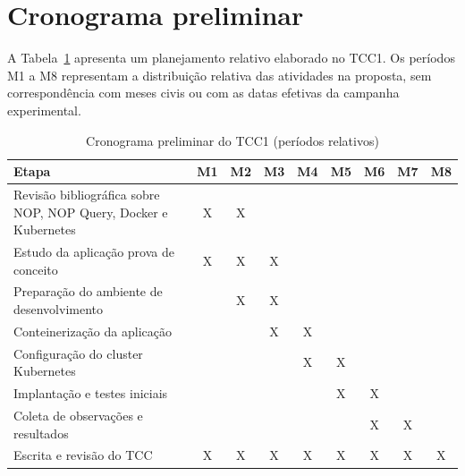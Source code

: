 \section{Cronograma preliminar}

A Tabela~\ref{tab:cronograma} apresenta um planejamento relativo elaborado no TCC1. Os períodos M1 a M8 representam a distribuição relativa das atividades na proposta, sem correspondência com meses civis ou com as datas efetivas da campanha experimental.

\begin{table}[htbp]
\centering
\caption{Cronograma preliminar do TCC1 (períodos relativos)}
\label{tab:cronograma}

\small
\renewcommand{\arraystretch}{1.3}

\begin{tabular}{p{7.2cm}cccccccc}
\hline
\textbf{Etapa} &
\textbf{M1} &
\textbf{M2} &
\textbf{M3} &
\textbf{M4} &
\textbf{M5} &
\textbf{M6} &
\textbf{M7} &
\textbf{M8} \\
\hline

Revisão bibliográfica sobre NOP, NOP Query, Docker e Kubernetes
& X & X & & & & & & \\

Estudo da aplicação prova de conceito
& X & X & X & & & & & \\

Preparação do ambiente de desenvolvimento
& & X & X & & & & & \\

Conteinerização da aplicação
& & & X & X & & & & \\

Configuração do cluster Kubernetes
& & & & X & X & & & \\

Implantação e testes iniciais
& & & & & X & X & & \\

Coleta de observações e resultados
& & & & & & X & X & \\

Escrita e revisão do TCC
& X & X & X & X & X & X & X & X \\

\hline
\end{tabular}
\end{table}
